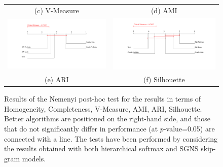 \begin{landscape}
\begin{figure}[h]
\begin{tabular}{@{}cc@{}}
    \scriptsize{(c) V-Measure}& \scriptsize{(d) AMI}\\
    \hspace{-1cm}\includegraphics*[scale=0.5]{./imgs/chap_4/Adj_Rand_index} &
    \includegraphics*[scale=0.5]{./imgs/chap_4/Silhouette}\\
    \scriptsize{(e) ARI}& \scriptsize{(f) Silhouette}\\
  \end{tabular}
  \caption{Results of the Nemenyi post-hoc test for the results in terms of Homogeneity, Completeness, V-Measure, AMI, ARI, Silhouette. Better algorithms are positioned on the right-hand side, and those that do not significantly differ in performance (at $p$-value=0.05) are connected with a line. The tests have been performed by considering the results obtained with both hierarchical softmax and SGNS skip-gram models.}
  \label{tab:Nemenyi}
\end{figure}


\end{landscape}




